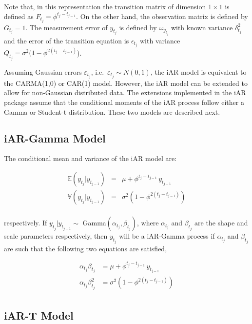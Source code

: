 Note that, in this representation the transition matrix of dimension \(1\times1\) is defined as \(F_{t_j} = \phi^{t_j-t_{j-1}}\). On the other hand, the observation matrix is defined by \(G_{t_j} = 1\). The measurement error of \(y_{t_j}\) is defined by \(\omega_{y_{t_j}}\) with known variance \(\delta^2_{t_j}\) and the error of the transition equation is \(\epsilon_{t_j}\) with variance \(Q_{t_j} =\sigma^2(1-\phi^{2(t_j-t_{j-1})}\)).

Assuming Gaussian errors \(\varepsilon_{t_j}\), i.e.~\(\varepsilon_{t_j}\sim N(0,1)\), the iAR model is equivalent to the CARMA(1,0) or CAR(1) model. However, the iAR model can be extended to allow for non-Gaussian distributed data. The extensions implemented in the iAR package assume that the conditional moments of the iAR process follow either a Gamma or Student-t distribution. These two models are described next.

\subsection{iAR-Gamma Model}\label{iar-gamma-model}

The conditional mean and variance of the iAR model are:

\begin{eqnarray*}
\mathbb{E}(y_{t_j}|y_{t_{j-1}})&=& \mu + \phi^{t_j-t_{j-1}} \, y_{t_{j-1}}\\
\mathbb{V}(y_{t_j}|y_{t_{j-1}})&=& \sigma^2 \left(1-\phi^{2(t_j-t_{j-1})}\right)\\
\end{eqnarray*}

respectively. If \(y_{t_j}|y_{t_{j-1}} \sim\) Gamma\((\alpha_{t_j},\beta_{t_j})\), where \(\alpha_{t_j}\) and \(\beta_{t_j}\) are the shape and scale parameters respectively, then \(y_{t_j}\) will be a iAR-Gamma process if \(\alpha_{t_j}\) and \(\beta_{t_j}\) are such that the following two equations are satisfied,

\begin{equation}
\begin{split}
\alpha_{t_j}\beta_{t_j} &= \mu + \phi^{t_j-t_{j-1}} \, y_{t_{j-1}}\\
\alpha_{t_j}\beta_{t_j}^2 &= \sigma^2 \left(1-\phi^{2(t_j-t_{j-1})}\right)\\
\end{split}
\label{eq:IARGamma}
\end{equation}

\subsection{iAR-T Model}\label{iar-t-model}

